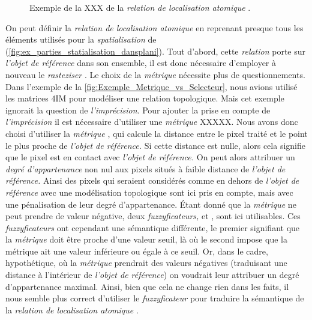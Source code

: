 \begin{figure}
  \centering
  
  \caption{Exemple de la XXX de la \emph{relation de localisation
      atomique} \protect{}.}
  \label{fig:ex_parties_statialisation_sousalt}
\end{figure}

On peut définir la \emph{relation de localisation atomique}
 en reprenant presque tous les
éléments utilisés pour la \emph{spatialisation} de
 (\autoref{fig:ex_parties_statialisation_dansplani}). Tout d'abord, cette \emph{relation}
porte sur \emph{l'objet de référence} dans son ensemble, il est donc
nécessaire d'employer à nouveau le \emph{rasteziser}
. Le choix de la \emph{métrique} nécessite plus
de questionnements.
%
Dans l'exemple de la \autoref{fig:Exemple_Metrique_vs_Selecteur}, nous
avions utilisé les matrices 4IM pour modéliser une relation
topologique. Mais cet exemple ignorait la question de
\emph{l'imprécision}. Pour ajouter la prise en compte de
\emph{l'imprécision} il est nécessaire d'utiliser une \emph{métrique}
XXXXX.
%
Nous avons donc choisi d'utiliser la \emph{métrique} ,
qui calcule la distance entre le pixel traité et le point le plus
proche de \emph{l'objet de référence.} Si cette distance est nulle,
alors cela signifie que le pixel est en contact avec \emph{l'objet de
  référence.} On peut alors attribuer un \emph{degré d'appartenance}
non nul aux pixels situés à faible distance de \emph{l'objet de
  référence.} Ainsi des pixels qui seraient considérés comme en dehors
de \emph{l'objet de référence} avec une modélisation topologique sont
ici pris en compte, mais avec une pénalisation de leur degré
d'appartenance. Étant donné que la \emph{métrique}  ne
peut prendre de valeur négative, deux \emph{fuzzyficateurs,}
 et , sont ici
utilisables. Ces \emph{fuzzyficateurs} ont cependant une sémantique
différente, le premier signifiant que la \emph{métrique} doit être
proche d'une valeur seuil, là où le second impose que la métrique ait
une valeur inférieure ou égale à ce seuil. Or, dans le cadre,
hypothétique, où la \emph{métrique}  prendrait des
valeurs négatives (\ie traduisant une distance à l'intérieur de
\emph{l'objet de référence}) on voudrait leur attribuer un degré
d'appartenance maximal. Ainsi, bien que cela ne change rien dans les
faits, il nous semble plus correct d'utiliser le \emph{fuzzyficateur}
 pour traduire la sémantique de la \emph{relation
  de localisation atomique} .

